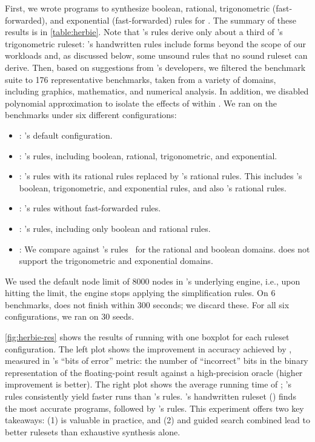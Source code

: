 First, we wrote \enumo programs to synthesize boolean,
  rational, trigonometric (fast-forwarded),
  and exponential (fast-forwarded) rules for \herbie.
The summary of these results is in \autoref{table:herbie}.
Note that \enumo's rules derive only about a third of
  \herbie's trigonometric ruleset:
  \herbie's handwritten rules include forms beyond
  the scope of our workloads and, as discussed below,
  some unsound rules that no sound ruleset can derive.
Then, based on suggestions from \herbie's developers,
  we filtered the \herbie benchmark suite to 176
  representative benchmarks, taken from a variety of domains,
  including graphics, mathematics, and numerical analysis.
In addition, we disabled polynomial approximation to
  isolate the effects of \eqsat within \herbie.
We ran \herbie on the benchmarks under six different configurations:
\begin{itemize}
  \item \foottt{\herbie}: \herbie's default configuration.
  \item \foottt{\enumo}: \enumo's rules, including boolean, rational, trigonometric, and exponential.
  \item {}: \enumo's rules with its rational rules replaced by 's rational rules. This includes \enumo's boolean, trigonometric, and exponential rules, and also 's rational rules.
  \item {}: \enumo's rules without fast-forwarded rules.
  \item {}: \enumo's rules, including only
  boolean and rational rules.
  \item {}: We compare against 's rules~\citep{ruler}
    for the rational and boolean domains.
     does not support the trigonometric and exponential domains.
\end{itemize}

We used the default node limit of 8000 nodes
  in \herbie's underlying \eqsat engine,
  i.e., upon hitting the limit,
  the engine stops applying the simplification rules.
On 6 benchmarks, \herbie does not finish
  within 300 seconds; we discard these.
For all six configurations,
  we ran \herbie on 30 seeds.

\autoref{fig:herbie-res} shows the results of running
  \herbie with one boxplot for each ruleset configuration.
The left plot
  shows the improvement in accuracy achieved by \herbie,
  measured in \herbie's ``bits of error'' metric:
  the number of ``incorrect'' bits
  in the binary representation of the floating-point
  result against a high-precision oracle
  (higher improvement is better).
The right plot shows the average running time of \herbie;
  \enumo's rules consistently yield faster runs
  than 's rules.
\herbie's handwritten ruleset (\herbie) finds the
  most accurate programs, followed by \enumo's rules.
This experiment offers two key takeaways:
  (1) \ff is valuable in practice, and (2) \ff and
  guided search combined lead to better rulesets than
  exhaustive synthesis alone.

